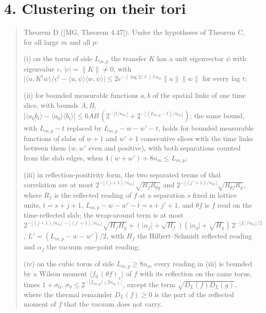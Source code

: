 \documentclass[10pt,letterpaper,twocolumn]{article}
\begin{document}
\section{4. Clustering on their tori}\label{4-clustering-on-their-tori}

\begin{quote}
Theorem D ({[}MG, Theorem 4.47{]}). Under the hypotheses of Theorem C, for all large \(m\) and all \(p\):

(i) on the torus of side \(L_{m,p}\) the transfer \(K\) has a unit eigenvector \(\psi\) with eigenvalue \(c\), \(\lvert c\rvert=\lVert K\rVert\ne0\), with \(\lvert\langle u,K^tw\rangle/c^t-\langle u,\psi\rangle\langle w,\psi\rangle\rvert\le2e^{-(\log2/\ell)\,t\,a_m}\lVert u\rVert\lVert w\rVert\) for every lag \(t\);

(ii) for bounded measurable functions \(a,b\) of the spatial links of one time slice, with bounds \(A,B\), \(\lvert\langle a_0b_t\rangle-\langle a_0\rangle\langle b_t\rangle\rvert\le6AB\,(2^{-\lfloor t/n_m\rfloor}+2^{-\lfloor(L_{m,p}-t)/n_m\rfloor})\); the same bound, with \(L_{m,p}-t\) replaced by \(L_{m,p}-w-w'-t\), holds for bounded measurable functions of slabs of \(w+1\) and \(w'+1\) consecutive slices with the time links between them (\(w,w'\) even and positive), with both separations counted from the slab edges, when \(4(w+w')+8n_m\le L_{m,p}\);

(iii) in reflection-positivity form, the two separated terms of that correlation are at most \(2^{-\lfloor (j+1)/n_m\rfloor}\sqrt{R_f R_{\theta g}}\) and \(2^{-\lfloor (j'+1)/n_m\rfloor}\sqrt{R_{\theta f}R_g}\), where \(R_f\) is the reflected reading of \(f\) at a separation \(s\) fixed in lattice units, \(t=s+j+1\), \(L_{m,p}-w-w'-t=s+j'+1\), and \(\theta f\) is \(f\) read on the time-reflected slab; the wrap-around term is at most \(2^{-\lfloor (j+1)/n_m\rfloor-\lfloor (j'+1)/n_m\rfloor}\sqrt{H_fH_g}+(\lvert\alpha_f\rvert+\sqrt{H_f})(\lvert\alpha_g\rvert+\sqrt{H_g})\,2^{-\lfloor L'/n_m\rfloor/2}\), \(L'=(L_{m,p}-w-w')/2\), with \(H_f\) the Hilbert--Schmidt reflected reading and \(\alpha_f\) the vacuum one-point reading;

(iv) on the cubic torus of side \(L_{m,p}\ge8n_m\) every reading in (iii) is bounded by a Wilson moment \(\langle f_0\,(\theta f)_s\rangle\) of \(f\) with its reflection on the same torus, times \(1+\sigma_0\), \(\sigma_0\le2^{-\lfloor L_{m,p}/(2n_m)\rfloor}\), except the term \(\sqrt{D_L(f)D_L(g)}\), where the thermal remainder \(D_L(f)\ge0\) is the part of the reflected moment of \(f\) that the vacuum does not carry.
\end{quote}
\end{document}
